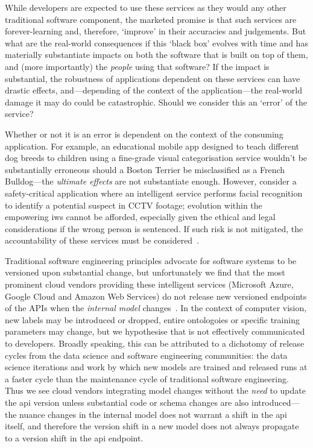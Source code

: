 While developers are expected to use these services as they would any other traditional software component, the marketed promise is that such services are forever-learning and, therefore, `improve' in their accuracies and judgements. But what are the real-world consequences if this `black box' evolves with time and has materially substantiate impacts on both the software that is built on top of them, and (more importantly) the \textit{people} using that software? If the impact is substantial, the robustness of applications dependent on these services can have drastic effects, and---depending of the context of the application---the real-world damage it may do could be catastrophic. Should we consider this an `error' of the service?

Whether or not it is an error is dependent on the context of the consuming application. For example, an educational mobile app designed to teach different dog breeds to children using a fine-grade visual categorisation service wouldn't be substantially erroneous should a Boston Terrier be misclassified as a French Bulldog---the \textit{ultimate effects} are not substantiate enough. However, consider a safety-critical application where an intelligent service performs facial recognition to identify a potential suspect in CCTV footage; evolution within the empowering \gls{iws} cannot be afforded, especially given the ethical and legal considerations if the wrong person is sentenced. If such risk is not mitigated, the accountability of these services must be considered~\citep{DoshiVelez:2017vm}.

Traditional software engineering principles advocate for software systems to be versioned upon substantial change, but unfortunately we find that the most prominent cloud vendors providing these intelligent services (Microsoft Azure, Google Cloud and Amazon Web Services) do not release new versioned endpoints of the APIs when the \textit{internal model} changes~\citep{Cummaudo:2019va}. In the context of computer vision, new labels may be introduced or dropped, entire ontologoies or specific training parameters may change, but we hypothesise that is not effectively communicated to developers. Broadly speaking, this can be attributed to a dichotomy of release cycles from the data science and software engineering communities: the data science iterations and work by which new models are trained and released runs at a faster cycle than the maintenance cycle of traditional software engineering. Thus we see cloud vendors integrating model changes without the \textit{need} to update the \gls{api} version unless substantial code or schema changes are also introduced---the nuance changes in the internal model does not warrant a shift in the \gls{api} itself, and therefore the version shift in a new model does not always propagate to a version shift in the \gls{api} endpoint.


